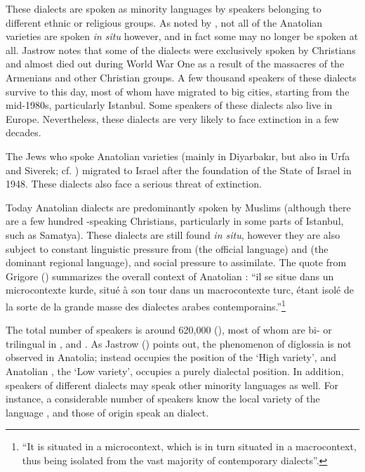 \documentclass[output=paper]{langsci/langscibook}
\begin{document}
These dialects are spoken as minority languages by speakers belonging to different ethnic or religious groups. As noted by \cite{Jastrow2006}, not all of the Anatolian  varieties are spoken \textit{in situ} however, and in fact some may no longer be spoken at all. Jastrow notes that some of the dialects were exclusively spoken by {Christians} and almost died out during World War One as a result of the massacres of the Armenians and other Christian groups. A few thousand speakers of these dialects survive to this day, most of whom have migrated to big cities, starting from the mid-1980s, particularly Istanbul. Some speakers of these dialects also live in Europe. Nevertheless, these dialects are very likely to face extinction in a few decades.

The {Jews} who spoke Anatolian  varieties (mainly in Diyarbak{\i}r, but also in Urfa and Siverek; cf. \citealt{Nevo1999}) migrated to Israel after the foundation of the State of Israel in 1948. These dialects also face a serious threat of extinction.

Today Anatolian  dialects are predominantly spoken by {Muslims} (although there are a few hundred -speaking {Christians}, particularly in some parts of Istanbul, such as Samatya). These dialects are still found \textit{in situ}, however they are also subject to constant linguistic pressure from  (the official language) and  (the dominant regional  language), and social pressure to assimilate. The quote from Grigore (\citeyear[27]{Grigore2007book}) summarizes the overall context of Anatolian : ``il se situe dans un microcontexte kurde, situé à son tour dans un macrocontexte turc, étant isolé de la sorte de la grande masse des dialectes arabes contemporains.''\footnote{``It is situated in a  microcontext, which is in turn situated in a  macrocontext, thus being isolated from the vast majority of contemporary  dialects''.}


The total number of speakers is around 620,000 (\citealt[162]{Procházka2018Anatolian}), most of whom are bi- or trilingual in
,  and . As Jastrow (\citeyear[88]{Jastrow2011anatolian}) points out, the phenomenon of {diglossia} is not observed in {Anatolia}; instead  occupies the position of the `High variety', and
Anatolian , the `Low variety', occupies a purely dialectal position. In addition, speakers of
different dialects may speak other minority languages as well. For instance, a considerable number of   speakers know the local variety of the  language , and those of  origin speak an  dialect.
\end{document}
